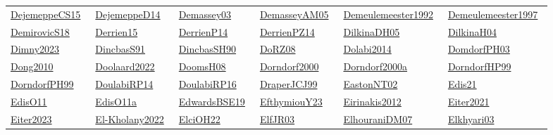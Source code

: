 \begin{longtable}{*{6}{l}}
\href{../works/DejemeppeCS15.pdf}{DejemeppeCS15}~\cite{DejemeppeCS15} & \href{../works/DejemeppeD14.pdf}{DejemeppeD14}~\cite{DejemeppeD14} & \href{../works/Demassey03.pdf}{Demassey03}~\cite{Demassey03} & \href{../works/DemasseyAM05.pdf}{DemasseyAM05}~\cite{DemasseyAM05} & \href{../}{Demeulemeester1992}~\cite{Demeulemeester1992} & \href{../}{Demeulemeester1997}~\cite{Demeulemeester1997}\\ 
\href{../works/DemirovicS18.pdf}{DemirovicS18}~\cite{DemirovicS18} & \href{../works/Derrien15.pdf}{Derrien15}~\cite{Derrien15} & \href{../works/DerrienP14.pdf}{DerrienP14}~\cite{DerrienP14} & \href{../works/DerrienPZ14.pdf}{DerrienPZ14}~\cite{DerrienPZ14} & \href{../works/DilkinaDH05.pdf}{DilkinaDH05}~\cite{DilkinaDH05} & \href{../works/DilkinaH04.pdf}{DilkinaH04}~\cite{DilkinaH04}\\ 
\href{../}{Dimny2023}~\cite{Dimny2023} & \href{../works/DincbasS91.pdf}{DincbasS91}~\cite{DincbasS91} & \href{../works/DincbasSH90.pdf}{DincbasSH90}~\cite{DincbasSH90} & \href{../works/DoRZ08.pdf}{DoRZ08}~\cite{DoRZ08} & \href{../}{Dolabi2014}~\cite{Dolabi2014} & \href{../}{DomdorfPH03}~\cite{DomdorfPH03}\\ 
\href{../}{Dong2010}~\cite{Dong2010} & \href{../}{Doolaard2022}~\cite{Doolaard2022} & \href{../works/DoomsH08.pdf}{DoomsH08}~\cite{DoomsH08} & \href{../works/Dorndorf2000.pdf}{Dorndorf2000}~\cite{Dorndorf2000} & \href{../}{Dorndorf2000a}~\cite{Dorndorf2000a} & \href{../}{DorndorfHP99}~\cite{DorndorfHP99}\\ 
\href{../}{DorndorfPH99}~\cite{DorndorfPH99} & \href{../works/DoulabiRP14.pdf}{DoulabiRP14}~\cite{DoulabiRP14} & \href{../works/DoulabiRP16.pdf}{DoulabiRP16}~\cite{DoulabiRP16} & \href{../works/DraperJCJ99.pdf}{DraperJCJ99}~\cite{DraperJCJ99} & \href{../works/EastonNT02.pdf}{EastonNT02}~\cite{EastonNT02} & \href{../works/Edis21.pdf}{Edis21}~\cite{Edis21}\\ 
\href{../works/EdisO11.pdf}{EdisO11}~\cite{EdisO11} & \href{../}{EdisO11a}~\cite{EdisO11a} & \href{../}{EdwardsBSE19}~\cite{EdwardsBSE19} & \href{../works/EfthymiouY23.pdf}{EfthymiouY23}~\cite{EfthymiouY23} & \href{../}{Eirinakis2012}~\cite{Eirinakis2012} & \href{../}{Eiter2021}~\cite{Eiter2021}\\ 
\href{../}{Eiter2023}~\cite{Eiter2023} & \href{../}{El-Kholany2022}~\cite{El-Kholany2022} & \href{../works/ElciOH22.pdf}{ElciOH22}~\cite{ElciOH22} & \href{../works/ElfJR03.pdf}{ElfJR03}~\cite{ElfJR03} & \href{../works/ElhouraniDM07.pdf}{ElhouraniDM07}~\cite{ElhouraniDM07} & \href{../works/Elkhyari03.pdf}{Elkhyari03}~\cite{Elkhyari03}\\ 

\end{longtable}
